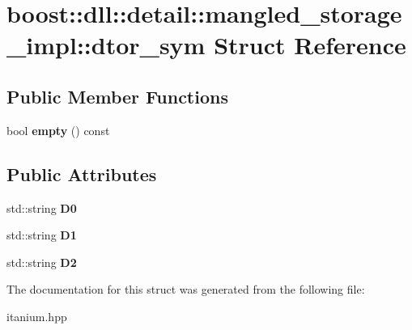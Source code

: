 \hypertarget{a01376}{}\section{boost\+:\+:dll\+:\+:detail\+:\+:mangled\+\_\+storage\+\_\+impl\+:\+:dtor\+\_\+sym Struct Reference}
\label{a01376}
\subsection*{Public Member Functions}
\begin{DoxyCompactItemize}
\item 
\mbox{\label{a01376_ab144596e9b758af754d0ccb1b968c67f}} 
bool {\bfseries empty} () const
\end{DoxyCompactItemize}
\subsection*{Public Attributes}
\begin{DoxyCompactItemize}
\item 
\mbox{\label{a01376_a17ef5095bb94db1ef8a318012710939a}} 
std\+::string {\bfseries D0}
\item 
\mbox{\label{a01376_af5d75b054b254565c9773f8b0b652d4b}} 
std\+::string {\bfseries D1}
\item 
\mbox{\label{a01376_ae40fab2db5138e03488b204b570ac72d}} 
std\+::string {\bfseries D2}
\end{DoxyCompactItemize}


The documentation for this struct was generated from the following file\+:\begin{DoxyCompactItemize}
\item 
itanium.\+hpp\end{DoxyCompactItemize}

